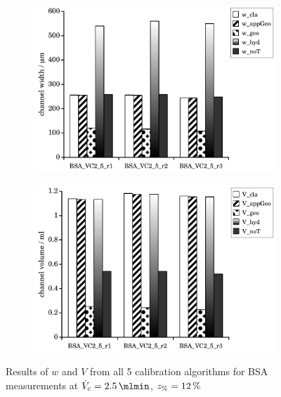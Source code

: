 \begin{figure}[htp]
  \begin{center}
    \begin{subfigure}{\subFigSize}
      \includegraphics[width=\linewidth]{./images/data/eval_own_p12/calibW_BSA_VC_2_5_p12.pdf}
    \end{subfigure}
    \begin{subfigure}{\subFigSize}
      \includegraphics[width=\linewidth]{./images/data/eval_own_p12/calibV_BSA_VC_2_5_p12.pdf}
    \end{subfigure}
  \end{center}
  \vspace*{-4ex}    
  \caption[Results of $w$ and $V$ from all 5 calibration algorithms for BSA measurements at
   $\Vc = \SI{2.5}{\mlmin}$, $\zP = \SI{12}{\percent}$]{
     Results of $w$ and $V$ from all 5 calibration algorithms for BSA measurements at
     $\Vc = \SI{2.5}{\mlmin}$, $\zP = \SI{12}{\percent}$
}
\label{fig:calibRes_BSA_VC2_5}
\end{figure}  
